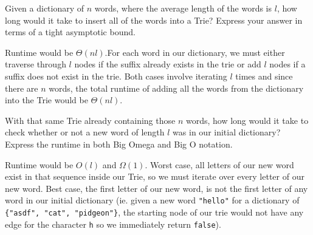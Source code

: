 \begin{blocksection}
\question Given a dictionary of $n$ words, where the average length of the words is $l$, how long would it take to insert all of the words into a Trie? Express your answer in terms of a tight asymptotic bound.


\begin{solution}[1in]
Runtime would be $\Theta(nl)$.\newline For each word in our dictionary, we must either traverse through $l$ nodes if the suffix already exists in the trie or add $l$ nodes if a suffix does not exist in the trie. Both cases involve iterating $l$ times and since there are $n$ words, the total runtime of adding all the words from the dictionary into the Trie would be $\Theta(nl)$. 
\end{solution}

\question With that same Trie already containing those $n$ words, how long would it take to check whether or not a new word of length $l$ was in our initial dictionary? Express the runtime in both Big Omega and Big O notation.

\begin{solution}
Runtime would be $O(l)$ and $\Omega(1)$. Worst case, all letters of our new word exist in that sequence inside our Trie, so we must iterate over every letter of our new word. Best case, the first letter of our new word, is not the first letter of any word in our initial dictionary (ie. given a new word \lstinline$"hello"$ for a dictionary of \lstinline${"asdf", "cat", "pidgeon"}$, the starting node of our trie would not have any edge for the character \lstinline$h$ so we immediately return \lstinline$false$).
\end{solution}
\end{blocksection}
